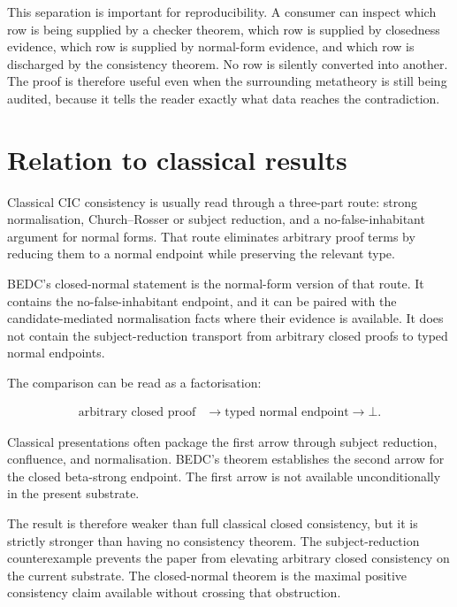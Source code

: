 This separation is important for reproducibility. A consumer can inspect which
row is being supplied by a checker theorem, which row is supplied by closedness
evidence, which row is supplied by normal-form evidence, and which row is
discharged by the consistency theorem. No row is silently converted into
another. The proof is therefore useful even when the surrounding metatheory is
still being audited, because it tells the reader exactly what data reaches the
contradiction.

\section{Relation to classical results}
\label{sec:closed-normal-consistency-main-result-classical}

Classical CIC consistency is usually read through a three-part route: strong
normalisation, Church--Rosser or subject reduction, and a no-false-inhabitant
argument for normal forms. That route eliminates arbitrary proof terms by
reducing them to a normal endpoint while preserving the relevant type.

BEDC's closed-normal statement is the normal-form version of that route. It
contains the no-false-inhabitant endpoint, and it can be paired with the
candidate-mediated normalisation facts where their evidence is available. It
does not contain the subject-reduction transport from arbitrary closed proofs
to typed normal endpoints.

The comparison can be read as a factorisation:

$$
\begin{aligned}
  \text{arbitrary closed proof}
  &\longrightarrow
  \text{typed normal endpoint}
  \longrightarrow
  \bot.
\end{aligned}
$$

Classical presentations often package the first arrow through subject
reduction, confluence, and normalisation. BEDC's theorem establishes the
second arrow for the closed beta-strong endpoint. The first arrow is not
available unconditionally in the present substrate.

The result is therefore weaker than full classical closed consistency, but it
is strictly stronger than having no consistency theorem. The subject-reduction
counterexample prevents the paper from elevating arbitrary closed consistency
on the current substrate. The closed-normal theorem is the maximal positive
consistency claim available without crossing that obstruction.

